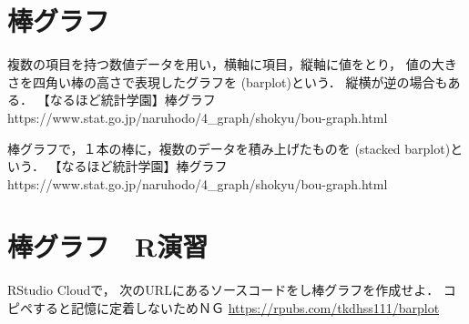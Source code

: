 \section{棒グラフ}

\MyFrame{\insertsection}
{
  { 
    複数の項目を持つ数値データを用い，横軸に項目，縦軸に値をとり，
    値の大きさを四角い棒の高さで表現したグラフを
    (barplot)という．
    縦横が逆の場合もある．
  }
  \MyRef
  {【なるほど統計学園】棒グラフ}
  {https://www.stat.go.jp/naruhodo/4_graph/shokyu/bou-graph.html}
}

\MyFrame{\insertsection}
{
  { 
    棒グラフで，１本の棒に，複数のデータを積み上げたものを
    (stacked barplot)という．
  }
  \MyRef
  {【なるほど統計学園】棒グラフ}
  {https://www.stat.go.jp/naruhodo/4_graph/shokyu/bou-graph.html}
}

\section{棒グラフ　R演習}

\MyFrame{\insertsection}
{
  RStudio Cloudで，
  次のURLにあるソースコードをし棒グラフを作成せよ．
  \alert{コピペすると記憶に定着しないためＮＧ}
  \url{https://rpubs.com/tkdhss111/barplot}
}

\MyFrame{}
{

}

{
}

\MyFrame{}
{
}

\MyFrame{}
{
}

\MyFrame{}
{
}


